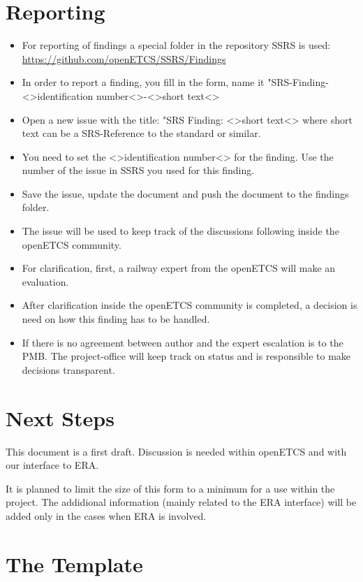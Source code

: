 \documentclass{template/openetcs_article}
\begin{document}
\section{Reporting}
\begin{itemize}
\item For reporting of findings a special folder in the repository SSRS is used: \url{https://github.com/openETCS/SSRS/Findings}
\item In order to report a finding, you fill in the form, name it "SRS-Finding-<>identification number<>-<>short text<>
\item  Open a new issue with the title: "SRS Finding: <>short text<> where short text can be a SRS-Reference to the standard or similar.
\item You need to set the <>identification number<> for the finding. Use the number of the issue in SSRS you used for this finding.
\item Save the issue, update the document and push the document to the findings folder.
\item The issue will be used to keep track of the discussions following inside the openETCS community. 
\item For clarification, first, a railway expert from the openETCS will make an evaluation.
\item After clarification inside the openETCS community is completed, a decision is need on how this finding has to be handled. 
\item If there is no agreement between author and the expert escalation is to the PMB. The project-office will keep track on status and is responsible to make decisions transparent.
\end{itemize}

\section{Next Steps}
This document is a first draft. Discussion is needed within openETCS and with our interface to ERA.

It is planned to limit the size of this form to a minimum for a use within the project. The addidional information (mainly related to the ERA interface) will be added only in the cases when ERA is involved.

\newpage

\section{The Template}
\end{document}
